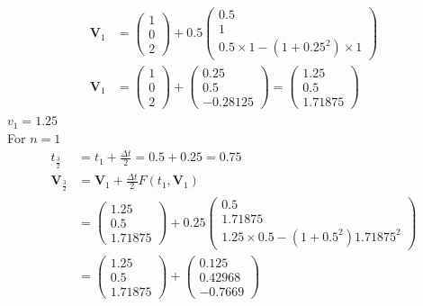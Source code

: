 \documentclass[12pt,a4paper]{article}
\begin{document}
\begin{itemize}
\begin{align*}
	\textbf{V}_{1}&=\begin{pmatrix}
	1\\0\\2
	\end{pmatrix}+0.5\begin{pmatrix}
	0.5\\
	1\\
	0.5\times 1-(1+0.25^{2})\times 1 
	\end{pmatrix}\\
	\textbf{V}_{1}&=\begin{pmatrix}
	1\\0\\2
	\end{pmatrix} + \begin{pmatrix}
	0.25\\
	0.5\\
	-0.28125
	\end{pmatrix}=\begin{pmatrix}
	1.25\\
	0.5\\
	1.71875
	\end{pmatrix}
	\end{align*}
	$v_{1}=1.25$\\
	\newline
	For $n=1$
	\begin{align*}
	t_{\frac{3}{2}}&=t_{1}+\frac{\Delta t}{2}=0.5+0.25=0.75\\
	\textbf{V}_{\frac{3}{2}}&=\textbf{V}_{1}+\frac{\Delta t}{2} F(t_{1}, \textbf{V}_{1})\\
	&=\begin{pmatrix}
	1.25\\
	0.5\\
	1.71875
	\end{pmatrix} +0.25\begin{pmatrix}
	0.5\\
	1.71875\\
	1.25 \times 0.5-(1+0.5^{2})1.71875^{2}
	\end{pmatrix}\\
	&=\begin{pmatrix}
	1.25\\
	0.5\\
	1.71875
	\end{pmatrix} + \begin{pmatrix}
	0.125\\
	0.42968\\
	-0.7669	
	\end{pmatrix}\\

\end{align*}
\end{itemize}
\end{document}
